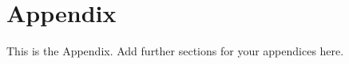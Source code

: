 \chapter{Appendix}\label{ch:appendix}

This is the Appendix. Add further sections for your appendices here.
